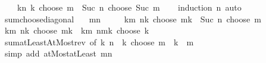 \begin{isabellebody}
\ \ \ \ {\isachardoublequoteopen}{\isacharparenleft}{\kern0pt}{\isasymSum}k{\isasymle}n{\isachardot}{\kern0pt}\ k\ choose\ m{\isacharparenright}{\kern0pt}\ {\isacharequal}{\kern0pt}\ Suc\ n\ choose\ Suc\ m{\isachardoublequoteclose}\isanewline
%
\isadelimproof
\ \ %
\endisadelimproof
%
\isatagproof
{}\isamarkupfalse%
\ {\isacharparenleft}{\kern0pt}induction\ n{\isacharparenright}{\kern0pt}\ auto%
\endisatagproof
{\isafoldproof}%
%
\isadelimproof
\isanewline
%
\endisadelimproof
\isanewline
{}\isamarkupfalse%
\ sum{\isacharunderscore}{\kern0pt}choose{\isacharunderscore}{\kern0pt}diagonal{\isacharcolon}{\kern0pt}\isanewline
\ \ \ {\isachardoublequoteopen}m{\isasymle}n{\isachardoublequoteclose}\isanewline
\ \ \ \ \ {\isachardoublequoteopen}{\isacharparenleft}{\kern0pt}{\isasymSum}k{\isasymle}m{\isachardot}{\kern0pt}\ {\isacharparenleft}{\kern0pt}n{\isacharminus}{\kern0pt}k{\isacharparenright}{\kern0pt}\ choose\ {\isacharparenleft}{\kern0pt}m{\isacharminus}{\kern0pt}k{\isacharparenright}{\kern0pt}{\isacharparenright}{\kern0pt}\ {\isacharequal}{\kern0pt}\ Suc\ n\ choose\ m{\isachardoublequoteclose}\isanewline
%
\isadelimproof
%
\endisadelimproof
%
\isatagproof
{}\isamarkupfalse%
\ {\isacharminus}{\kern0pt}\isanewline
\ \ \isamarkupfalse%
\ {\isachardoublequoteopen}{\isacharparenleft}{\kern0pt}{\isasymSum}k{\isasymle}m{\isachardot}{\kern0pt}\ {\isacharparenleft}{\kern0pt}n{\isacharminus}{\kern0pt}k{\isacharparenright}{\kern0pt}\ choose\ {\isacharparenleft}{\kern0pt}m{\isacharminus}{\kern0pt}k{\isacharparenright}{\kern0pt}{\isacharparenright}{\kern0pt}\ {\isacharequal}{\kern0pt}\ {\isacharparenleft}{\kern0pt}{\isasymSum}k{\isasymle}m{\isachardot}{\kern0pt}\ {\isacharparenleft}{\kern0pt}n{\isacharminus}{\kern0pt}m{\isacharplus}{\kern0pt}k{\isacharparenright}{\kern0pt}\ choose\ k{\isacharparenright}{\kern0pt}{\isachardoublequoteclose}\isanewline
\ \ \ \ \isamarkupfalse%
\ sum{\isachardot}{\kern0pt}atLeastAtMost{\isacharunderscore}{\kern0pt}rev\ {\isacharbrackleft}{\kern0pt}of\ {\isachardoublequoteopen}{\isasymlambda}k{\isachardot}{\kern0pt}\ {\isacharparenleft}{\kern0pt}n\ {\isacharminus}{\kern0pt}\ k{\isacharparenright}{\kern0pt}\ choose\ {\isacharparenleft}{\kern0pt}m\ {\isacharminus}{\kern0pt}\ k{\isacharparenright}{\kern0pt}{\isachardoublequoteclose}\ {}\ m{\isacharbrackright}{\kern0pt}\isanewline
\ \ \ \ \isamarkupfalse%
\ {\isacharparenleft}{\kern0pt}simp\ add{\isacharcolon}{\kern0pt}\ atMost{\isacharunderscore}{\kern0pt}atLeast{}\ {\isacartoucheopen}m{\isasymle}n{\isacartoucheclose}{\isacharparenright}{\kern0pt}\isanewline

\end{isabellebody}
